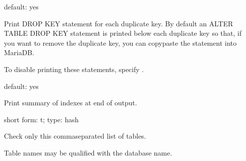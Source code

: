 \documentclass[letterpaper,10pt,english]{sphinxmanual}
\begin{document}
\begin{fulllineitems}
\label{\detokenize{mariadb-index-checker:cmdoption-mariadb-index-checker-1}}
default: yes

Print DROP KEY statement for each duplicate key.  By default an ALTER TABLE
DROP KEY statement is printed below each duplicate key so that, if you want to
remove the duplicate key, you can copy\sphinxhyphen{}paste the statement into MariaDB.

To disable printing these statements, specify .

\end{fulllineitems}


\begin{fulllineitems}
\label{\detokenize{mariadb-index-checker:cmdoption-mariadb-index-checker-2}}
default: yes

Print summary of indexes at end of output.

\end{fulllineitems}


\begin{fulllineitems}
\label{\detokenize{mariadb-index-checker:cmdoption-mariadb-index-checker-tables}}
short form: \sphinxhyphen{}t; type: hash

Check only this comma\sphinxhyphen{}separated list of tables.

Table names may be qualified with the database name.

\end{fulllineitems}
\end{document}
